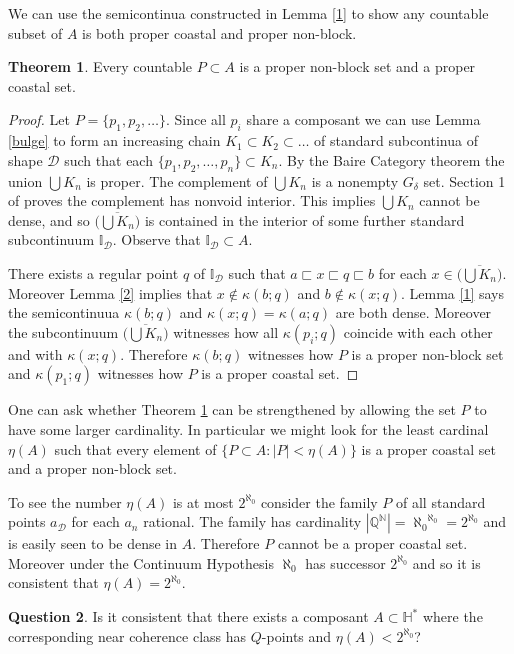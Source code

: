 \documentclass[12pt]{article}
\theoremstyle{plain}
\theoremstyle{definition}
\newtheorem{theorem}{Theorem}[section]
\newtheorem{question}[theorem]{Question}
\newcommand{\K}{\ensuremath{\kappa}}
\newcommand{\II}{\ensuremath{\mathbb I}}
\newcommand{\QQ}{\ensuremath{\mathbb Q}}
\newcommand{\NN}{\ensuremath{\mathbb N}}
\newcommand{\HH}{\ensuremath{\mathbb H}}
\newcommand{\0}{\ensuremath{\varnothing}}
\newcommand{\cD}{\ensuremath{\mathcal D}}
\begin{document}
	We can use the semicontinua constructed in Lemma \ref{1} to show any countable subset of $A$ is both proper coastal and proper non-block.
	
	\begin{theorem} \label{Q}
		Every countable $P \subset A$ is a proper non-block set and a proper coastal set.
	\end{theorem}
	
	\begin{proof}
		Let $P = \{p_1,p_2, \ldots\}$. Since all $p_i$ share a composant we can use Lemma \ref{bulge} 
		to form an increasing chain $K_1 \subset K_2 \subset \ldots$ of standard subcontinua of shape $\cD$ 
		such that each $\{p_1,p_2, \ldots, p_n\} \subset K_n$. 
		By the Baire Category theorem the union $\bigcup K_n$ is proper. 
		The complement of $\bigcup K_n$ is a nonempty $G_\delta$ set. 
		Section 1 of \cite{almostPLevy} proves the complement has nonvoid interior. 
		This implies $\bigcup K_n$ cannot be dense, 
		and so $\overline {\big ( \bigcup K_n \big )}$ is contained in the interior of some further standard subcontinuum $\II_\cD$. 
		Observe that $\II_\cD \subset A$. 
		
		There exists a regular point $q$ of $\II_\cD$ such that $a \sqsubset x \sqsubset q \sqsubset b$ for each $x \in \overline {\big ( \bigcup K_n \big )}$. 
		Moreover Lemma \ref{2} implies that $x \notin \K(b;q)$ and $b \notin \K(x;q)$. Lemma \ref{1} says the semicontinuua $\K(b;q)$ and $\K(x;q)=\K(a;q)$ are both dense. 
		Moreover the subcontinuum $\overline {\big ( \bigcup K_n \big )}$ witnesses how all $\K(p_i;q)$ coincide with each other and with $\K(x;q)$. Therefore $\K(b;q)$ witnesses how $P$ is a proper non-block set and $\K(p_1;q)$ witnesses how $P$ is a proper coastal set.  
	\end{proof}
	
	One can ask whether Theorem \ref{Q} can be strengthened by allowing the set $P$ to have some larger cardinality. In particular 
	we might look for the least cardinal $\eta(A)$ such that every element of $\{P \subset A \colon |P|<\eta(A)\}$ 
	is a proper coastal set and a proper non-block set.
	
	
	To see the number $\eta(A)$ is at most $2^{\aleph_0}$  consider the family $P$ of all standard points $a_\cD$ for each $a_n$ rational. 
	The family has cardinality $|\QQ^ \NN| = {\aleph_0}^{\aleph_0} = 2^{\aleph_0}$ and is easily seen to be dense in $A$. 
	Therefore $P$ cannot be a proper coastal set. Moreover under the Continuum Hypothesis $\aleph_0$ has successor 
	$2^{\aleph_0}$ and so it is consistent that $\eta(A) = 2^{\aleph_0}$. 
	\begin{question}
		Is it consistent that there exists a composant $A \subset \HH^*$ where the corresponding near coherence class has $Q$-points and $\eta(A) < 2^{\aleph_0}$?
	\end{question}
	
\end{document}
